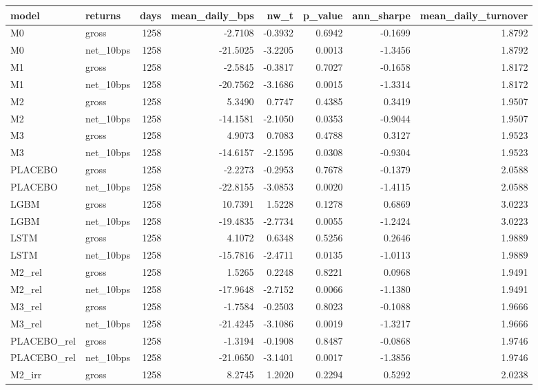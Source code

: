 \begin{tabular}{llrrrrrr}
\toprule
model & returns & days & mean\_daily\_bps & nw\_t & p\_value & ann\_sharpe & mean\_daily\_turnover \\
\midrule
M0 & gross & 1258 & -2.7108 & -0.3932 & 0.6942 & -0.1699 & 1.8792 \\
M0 & net\_10bps & 1258 & -21.5025 & -3.2205 & 0.0013 & -1.3456 & 1.8792 \\
M1 & gross & 1258 & -2.5845 & -0.3817 & 0.7027 & -0.1658 & 1.8172 \\
M1 & net\_10bps & 1258 & -20.7562 & -3.1686 & 0.0015 & -1.3314 & 1.8172 \\
M2 & gross & 1258 & 5.3490 & 0.7747 & 0.4385 & 0.3419 & 1.9507 \\
M2 & net\_10bps & 1258 & -14.1581 & -2.1050 & 0.0353 & -0.9044 & 1.9507 \\
M3 & gross & 1258 & 4.9073 & 0.7083 & 0.4788 & 0.3127 & 1.9523 \\
M3 & net\_10bps & 1258 & -14.6157 & -2.1595 & 0.0308 & -0.9304 & 1.9523 \\
PLACEBO & gross & 1258 & -2.2273 & -0.2953 & 0.7678 & -0.1379 & 2.0588 \\
PLACEBO & net\_10bps & 1258 & -22.8155 & -3.0853 & 0.0020 & -1.4115 & 2.0588 \\
LGBM & gross & 1258 & 10.7391 & 1.5228 & 0.1278 & 0.6869 & 3.0223 \\
LGBM & net\_10bps & 1258 & -19.4835 & -2.7734 & 0.0055 & -1.2424 & 3.0223 \\
LSTM & gross & 1258 & 4.1072 & 0.6348 & 0.5256 & 0.2646 & 1.9889 \\
LSTM & net\_10bps & 1258 & -15.7816 & -2.4711 & 0.0135 & -1.0113 & 1.9889 \\
M2\_rel & gross & 1258 & 1.5265 & 0.2248 & 0.8221 & 0.0968 & 1.9491 \\
M2\_rel & net\_10bps & 1258 & -17.9648 & -2.7152 & 0.0066 & -1.1380 & 1.9491 \\
M3\_rel & gross & 1258 & -1.7584 & -0.2503 & 0.8023 & -0.1088 & 1.9666 \\
M3\_rel & net\_10bps & 1258 & -21.4245 & -3.1086 & 0.0019 & -1.3217 & 1.9666 \\
PLACEBO\_rel & gross & 1258 & -1.3194 & -0.1908 & 0.8487 & -0.0868 & 1.9746 \\
PLACEBO\_rel & net\_10bps & 1258 & -21.0650 & -3.1401 & 0.0017 & -1.3856 & 1.9746 \\
M2\_irr & gross & 1258 & 8.2745 & 1.2020 & 0.2294 & 0.5292 & 2.0238 \\

\end{tabular}
